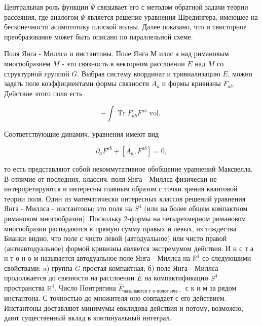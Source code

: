 \documentclass[10pt]{article}
\begin{document}
Центральная роль функции $\Psi$ связывает его с методом обратной задачи теории рассеяния, где аналогом $\Psi$ является решение уравнения Шредингера, имеюшее на бесконечности асимптотику плоской волны. Далее показано, что и твисторное преобразование может быть описано по параллельной схеме.



Поля Янга - Миллса и инстантоны. Поле Янга М иллс а над римановым многообразием $M$ - это связность в векторном расслоении $E$ над $M$ со структурной группой $G$. Выбрав систему координат и тривиализацию $E$, можно задать поле коэффициентами формы связности $A_{a}$ и формы кривизны $F_{a b}$. Действие этого поля есть



\[

-\int \operatorname{Tr} F_{a b} F^{a b} \text { vol. }

\]



Соответствующие динамич. уравнения имеют вид



\[

\partial_{a} F^{a b}+\left[A_{a}, F^{a b}\right]=0,

\]



то есть представляют собой некоммутативное обобщение уравнений Максвелла. В отличие от последних, классич. поля Янга - Миллса физически не интерпретируются и интересны главным образом с точки зрения квантовой теории поля. Один из математически интересных классов решений уравнения Янга - Миллса - инстантоны; это поля на $S^{4}$ (или на более общем компактном римановом многообразии). Поскольку 2-формы на четырехмерном римановом многообразии распадаются в прямую сумму правых и левых, из тождества Бианки видно, что поле с чисто левой (автодуальное) или чисто правой (антиавтодуальное) формой кривизны является экстремумом действия. И н с т а н т о н о м называется автодуальное поле Янга - Миллса на $\mathbb{R}^{4}$ со следуюшими свойствами: a) группа $G$ простая компактная; б) поле Янга - Миллса продолжается до связности на расслоении $\hat{E}$ на компактификации $S^{4}$ пространства $\mathbb{R}^{4}$. Число Понтрягина $\hat{E}_{\text {называется т о полог иче - }}$ с к и м за рядом инстантона. С точностью до множителя оно совпадает с его действием. Инстантоны доставляют минимумы евклидова действия и потому, возможно, дают существенный вклад в континуальный интеграл.
\end{document}

